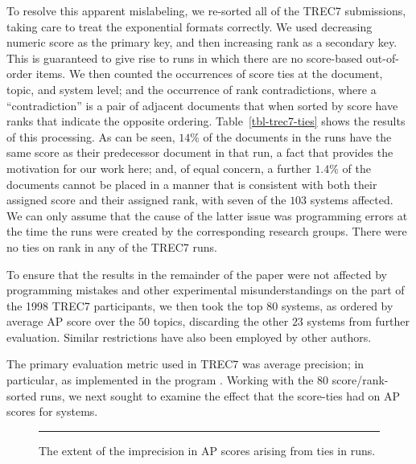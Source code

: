 To resolve this apparent mislabeling, we re-sorted all of the TREC7
submissions, taking care to treat the exponential formats correctly.
We used decreasing numeric score as the primary key, and then
increasing rank as a secondary key.
This is guaranteed to give rise to runs in which there are no
score-based out-of-order items.
We then counted the occurrences of score ties at the document, topic,
and system level; and the occurrence of rank contradictions, where a
``contradiction'' is a pair of adjacent documents that when sorted by
score have ranks that indicate the opposite ordering.
Table~\ref{tbl-trec7-ties} shows the results of this processing.
As can be seen, $14$\% of the documents in the runs have the same
score as their predecessor document in that run, a fact that provides
the motivation for our work here; and, of equal concern, a further
$1.4$\% of the documents cannot be placed in a manner that is
consistent with both their assigned score and their assigned rank,
with seven of the $103$ systems affected.
We can only assume that the cause of the latter issue was programming
errors at the time the runs were created by the corresponding
research groups.
There were no ties on rank in any of the TREC7 runs.

To ensure that the results in the remainder of the paper were not
affected by programming mistakes and other experimental
misunderstandings on the part of the 1998 TREC7 participants, we then
took the top $80$ systems, as ordered by average AP score over the
$50$ topics, discarding the other $23$ systems from further
evaluation.
Similar restrictions have also been employed by other authors.



The primary evaluation metric used in TREC7 was average precision; in
particular, as implemented in the program {\treceval}.
Working with the $80$ score/rank-sorted runs, we next sought to
examine the effect that the score-ties had on AP scores for systems.

\begin{figure}[t!]
\centering
\rule{0.5mm}{50mm}
\caption{The extent of the imprecision in AP scores arising from ties
in runs.
{}
\label{fig-trec7-ap-scores}}
\end{figure}

